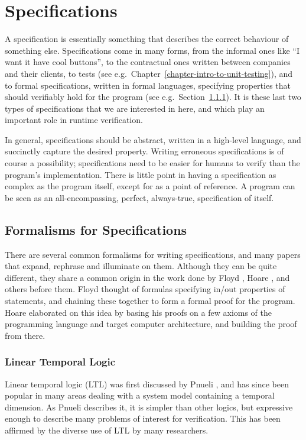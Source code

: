 \documentclass[a4paper,11pt]{kth-mag}
\begin{document}
\section{Specifications} \label{section-specifications}

A specification is essentially something that describes the correct behaviour
of something else. Specifications come in many forms, from the informal ones
like ``I want it have cool buttons'', to the contractual ones written between
companies and their clients, to tests (see e.g.\
Chapter~\ref{chapter-intro-to-unit-testing}), and to formal specifications,
written in formal languages, specifying properties that should verifiably hold
for the program (see e.g.\ Section~\ref{section-ltl}). It is these last two
types of specifications that we are interested in here, and which play an
important role in runtime verification.

In general, specifications should be abstract, written in a high-level
language, and succinctly capture the desired property. Writing erroneous
specifications is of course a possibility; specifications need to be easier for
humans to verify than the program's implementation. There is little point in
having a specification as complex as the program itself, except for as a point
of reference. A program can be seen as an all-encompassing, perfect,
always-true, specification of itself.


\subsection{Formalisms for Specifications}

There are several common formalisms for writing specifications, and many papers
that expand, rephrase and illuminate on them. Although they can be quite
different, they share a common origin in the work done by Floyd \cite{floyd67},
Hoare \cite{hoare69}, and others before them.  Floyd thought of formulas
specifying in/out properties of statements, and chaining these together to form
a formal proof for the program. Hoare elaborated on this idea by basing his
proofs on a few axioms of the programming language and target computer
architecture, and building the proof from there.


\subsubsection{Linear Temporal Logic} \label{section-ltl}

Linear temporal logic (LTL) was first discussed by Pnueli \cite{pnueli77}, and
has since been popular in many areas dealing with a system model containing a
temporal dimension. As Pnueli describes it, it is simpler than other logics,
but expressive enough to describe many problems of interest for verification.
This has been affirmed by the diverse use of LTL by many researchers.
\end{document}

